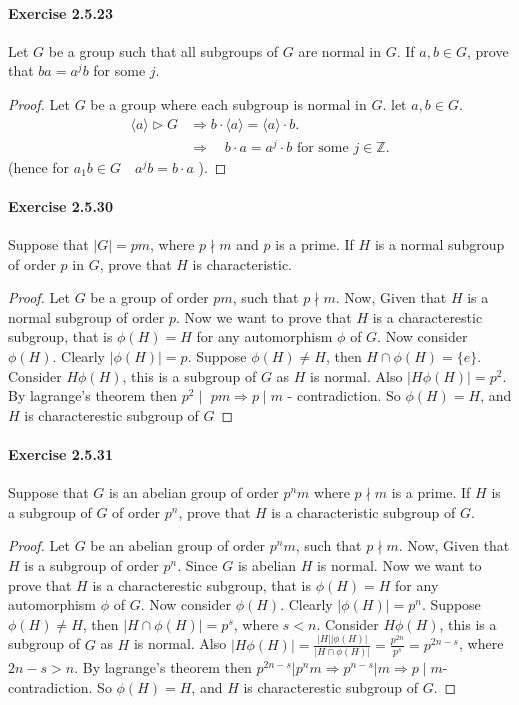 \documentclass{article}
\begin{document}
\paragraph{Exercise 2.5.23} Let $G$ be a group such that all subgroups of $G$ are normal in $G$. If $a, b \in G$, prove that $ba = a^jb$ for some $j$.
\begin{proof}
    Let $G$ be a group where each subgroup is normal in $G$. let $a, b \in G$.
$$
\begin{aligned}
    \langle a\rangle\triangleright  G  &\Rightarrow b \cdot\langle a\rangle=\langle a\rangle \cdot b . \\
& \Rightarrow \quad b \cdot a=a^j \cdot b \text { for some } j \in \mathbb{Z}.
\end{aligned}
$$
(hence for $a_1 b \in G \quad a^j b=b \cdot a$ ).
\end{proof}


\paragraph{Exercise 2.5.30} Suppose that $|G| = pm$, where $p \nmid m$ and $p$ is a prime. If $H$ is a normal subgroup of order $p$ in $G$, prove that $H$ is characteristic.
\begin{proof}
    Let $G$ be a group of order $p m$, such that $p \nmid m$. Now, Given that $H$ is a normal subgroup of order $p$. Now we want to prove that $H$ is a characterestic subgroup, that is $\phi(H)=H$ for any automorphism $\phi$ of $G$. Now consider $\phi(H)$. Clearly $|\phi(H)|=p$. Suppose $\phi(H) \neq H$, then $H \cap \phi (H)=\{ e\}$. Consider $H \phi(H)$, this is a subgroup of $G$ as $H$ is normal. Also $|H \phi(H)|=p^2$. By lagrange's theorem then $p^2 \mid$ $p m \Longrightarrow p \mid m$ - contradiction. So $\phi(H)=H$, and $H$ is characterestic subgroup of $G$
\end{proof}


\paragraph{Exercise 2.5.31} Suppose that $G$ is an abelian group of order $p^nm$ where $p \nmid m$ is a prime.  If $H$ is a subgroup of $G$ of order $p^n$, prove that $H$ is a characteristic subgroup of $G$.
\begin{proof}
    Let $G$ be an abelian group of order $p^n m$, such that $p \nmid m$. Now, Given that $H$ is a subgroup of order $p^n$. Since $G$ is abelian $H$ is normal. Now we want to prove that $H$ is a characterestic subgroup, that is $\phi(H)=H$ for any automorphism $\phi$ of $G$. Now consider $\phi(H)$. Clearly $|\phi(H)|=p^n$. Suppose $\phi(H) \neq H$, then $|H \cap \phi(H)|=p^s$, where $s<n$. Consider $H \phi(H)$, this is a subgroup of $G$ as $H$ is normal. Also $|H \phi(H)|=\frac{|H||\phi(H)|}{|H \cap \phi(H)|}=\frac{p^{2 n}}{p^s}=p^{2 n-s}$, where $2 n-s>n$. By lagrange's theorem then $p^{2 n-s}\left|p^n m \Longrightarrow p^{n-s}\right| m \Longrightarrow p \mid m$-contradiction. So $\phi(H)=H$, and $H$ is characterestic subgroup of $G$.
\end{proof}
\end{document}
